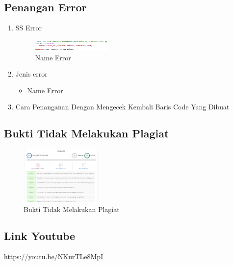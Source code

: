 \subsection{Penangan Error}
\begin{enumerate}
	\item SS Error
	\hfill\break
		\begin{figure}[H]
			\includegraphics[width=4cm]{figures/1174069/5/error/5_name_error.png}
			\centering
			\caption{Name Error}
		\end{figure}
	\item Jenis error
	\begin{itemize}
		\item Name Error
	\end{itemize}
	\item Cara Penanganan
	\hfill\break
	Dengan Mengecek Kembali Baris Code Yang Dibuat
\end{enumerate}
\subsection{Bukti Tidak Melakukan Plagiat}
\hfill\break
\begin{figure}[H]
	\includegraphics[width=4cm]{figures/1174069/5/bukti/bukti.PNG}
	\centering
	\caption{Bukti Tidak Melakukan Plagiat}
\end{figure}
\subsection{Link Youtube}
https://youtu.be/NKurTLe8MpI